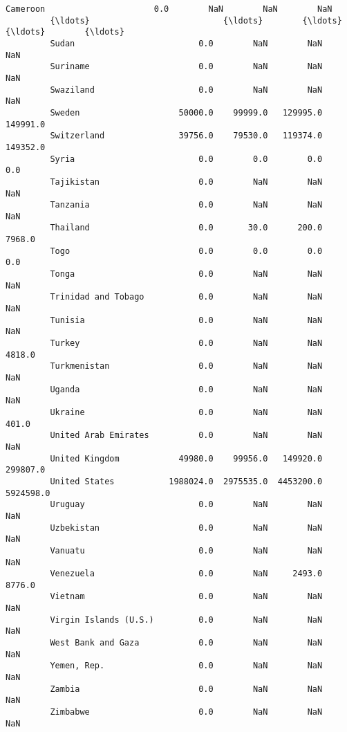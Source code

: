 \documentclass[11pt]{article}
\begin{document}
\begin{Verbatim}[commandchars=\\\{\}]
         Cameroon                      0.0        NaN        NaN        NaN   
         {\ldots}                           {\ldots}        {\ldots}        {\ldots}        {\ldots}   
         Sudan                         0.0        NaN        NaN        NaN   
         Suriname                      0.0        NaN        NaN        NaN   
         Swaziland                     0.0        NaN        NaN        NaN   
         Sweden                    50000.0    99999.0   129995.0   149991.0   
         Switzerland               39756.0    79530.0   119374.0   149352.0   
         Syria                         0.0        0.0        0.0        0.0   
         Tajikistan                    0.0        NaN        NaN        NaN   
         Tanzania                      0.0        NaN        NaN        NaN   
         Thailand                      0.0       30.0      200.0     7968.0   
         Togo                          0.0        0.0        0.0        0.0   
         Tonga                         0.0        NaN        NaN        NaN   
         Trinidad and Tobago           0.0        NaN        NaN        NaN   
         Tunisia                       0.0        NaN        NaN        NaN   
         Turkey                        0.0        NaN        NaN     4818.0   
         Turkmenistan                  0.0        NaN        NaN        NaN   
         Uganda                        0.0        NaN        NaN        NaN   
         Ukraine                       0.0        NaN        NaN      401.0   
         United Arab Emirates          0.0        NaN        NaN        NaN   
         United Kingdom            49980.0    99956.0   149920.0   299807.0   
         United States           1988024.0  2975535.0  4453200.0  5924598.0   
         Uruguay                       0.0        NaN        NaN        NaN   
         Uzbekistan                    0.0        NaN        NaN        NaN   
         Vanuatu                       0.0        NaN        NaN        NaN   
         Venezuela                     0.0        NaN     2493.0     8776.0   
         Vietnam                       0.0        NaN        NaN        NaN   
         Virgin Islands (U.S.)         0.0        NaN        NaN        NaN   
         West Bank and Gaza            0.0        NaN        NaN        NaN   
         Yemen, Rep.                   0.0        NaN        NaN        NaN   
         Zambia                        0.0        NaN        NaN        NaN   
         Zimbabwe                      0.0        NaN        NaN        NaN   
         

\end{Verbatim}
\end{document}
